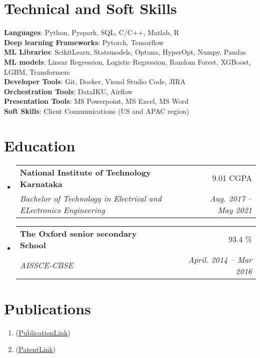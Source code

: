 \documentclass[letterpaper,11pt]{article}
\makeatletter
\newcommand{\resumeSubheading}[4]{
  \vspace{-4pt}\item
    \begin{tabular*}{0.97\textwidth}[t]{l@{\extracolsep{\fill}}r}
      \textbf{#1} & #2 \\
      \textit{\small#3} & \textit{\small #4} \\
    \end{tabular*}\vspace{-10pt}
}
\newcommand{\resumeSubHeadingListStart}{\begin{itemize}[leftmargin=0.1in, label={}]}
\newcommand{\resumeSubHeadingListEnd}{\end{itemize}}
\makeatother
\begin{document}
\section{Technical and Soft Skills}
 \begin{itemize}[leftmargin=0.15in, label={}]
    \small{\item{
     \textbf{Languages}{: Python, Pyspark, SQL, C/C++, Matlab, R} \\
     \textbf{Deep learning Frameworks}{: Pytorch, Tensorflow} \\
     \textbf{ML Libraries}{: ScikitLearn, Statsmodels, Optuna, HyperOpt, Numpy, Pandas} \\
     \textbf{ML models}{: Linear Regression, Logistic Regression, Random Forest, XGBoost, LGBM, Transformers} \\
     \textbf{Developer Tools}{: Git, Docker, Visual Studio Code, JIRA} \\
     \textbf{Orchestration Tools}{: DataIKU, Airflow} \\
     \textbf{Presentation Tools}{: MS Powerpoint, MS Excel, MS Word} \\
     \textbf{Soft Skills}{: Client Communications (US and APAC region)}
    }}
 \end{itemize}

\section{Education}
  \resumeSubHeadingListStart
    \resumeSubheading
      {National Institute of Technology Karnataka}{9.01 CGPA}
      {Bachelor of Technology in Electrical and ELectronics Engineering}{Aug. 2017 -- May 2021}
    \resumeSubheading
      {The Oxford senior secondary School}{93.4 \%}
      {AISSCE-CBSE}{April. 2014 -- Mar 2016}
  \resumeSubHeadingListEnd

 

\section*{Publications}
  \begin{enumerate}
    \item {}
    (\href{https://ieeexplore.ieee.org/document/9597799}{\underline{PublicationLink}})

  \item {}
  (\href{https://www.nitk.ac.in/patent-granted-to-dr-tukaram-moger-team}{\underline{PatentLink}})
  \end{enumerate}

\end{document}
